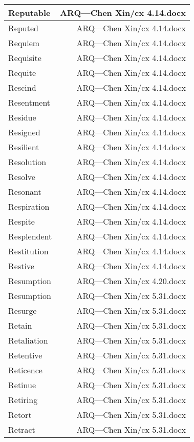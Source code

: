 \documentclass{article}
\begin{document}
\begin{center}
\begin{longtable}{|l|r|}
\hline
Reputable  &  ARQ---Chen Xin/cx 4.14.docx\\  
\hline
Reputed  &  ARQ---Chen Xin/cx 4.14.docx\\  
\hline
Requiem  &  ARQ---Chen Xin/cx 4.14.docx\\  
\hline
Requisite  &  ARQ---Chen Xin/cx 4.14.docx\\  
\hline
Requite  &  ARQ---Chen Xin/cx 4.14.docx\\  
\hline
Rescind  &  ARQ---Chen Xin/cx 4.14.docx\\  
\hline
Resentment  &  ARQ---Chen Xin/cx 4.14.docx\\  
\hline
Residue  &  ARQ---Chen Xin/cx 4.14.docx\\  
\hline
Resigned  &  ARQ---Chen Xin/cx 4.14.docx\\  
\hline
Resilient  &  ARQ---Chen Xin/cx 4.14.docx\\  
\hline
Resolution  &  ARQ---Chen Xin/cx 4.14.docx\\  
\hline
Resolve  &  ARQ---Chen Xin/cx 4.14.docx\\  
\hline
Resonant  &  ARQ---Chen Xin/cx 4.14.docx\\  
\hline
Respiration  &  ARQ---Chen Xin/cx 4.14.docx\\  
\hline
Respite  &  ARQ---Chen Xin/cx 4.14.docx\\  
\hline
Resplendent  &  ARQ---Chen Xin/cx 4.14.docx\\  
\hline
Restitution  &  ARQ---Chen Xin/cx 4.14.docx\\  
\hline
Restive  &  ARQ---Chen Xin/cx 4.14.docx\\  
\hline
Resumption  &  ARQ---Chen Xin/cx 4.20.docx\\  
\hline
Resumption  &  ARQ---Chen Xin/cx 5.31.docx\\  
\hline
Resurge  &  ARQ---Chen Xin/cx 5.31.docx\\  
\hline
Retain  &  ARQ---Chen Xin/cx 5.31.docx\\  
\hline
Retaliation  &  ARQ---Chen Xin/cx 5.31.docx\\  
\hline
Retentive  &  ARQ---Chen Xin/cx 5.31.docx\\  
\hline
Reticence  &  ARQ---Chen Xin/cx 5.31.docx\\  
\hline
Retinue  &  ARQ---Chen Xin/cx 5.31.docx\\  
\hline
Retiring  &  ARQ---Chen Xin/cx 5.31.docx\\  
\hline
Retort  &  ARQ---Chen Xin/cx 5.31.docx\\  
\hline
Retract  &  ARQ---Chen Xin/cx 5.31.docx\\  

\end{longtable}
\end{center}
\end{document}
